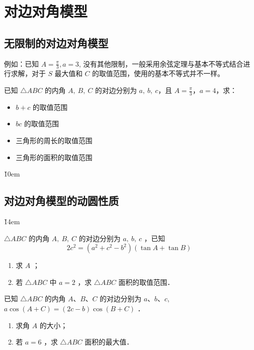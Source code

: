 \section{对边对角模型}

\subsection{无限制的对边对角模型}

\begin{theorem}[无限制的对边对角模型]
    例如：已知 $A = \frac{\pi}{3}, a=3$, 没有其他限制，一般采用余弦定理与基本不等式结合进行求解，对于 $S$ 最大值和 $C$ 的取值范围，使用的基本不等式并不一样。
\end{theorem}

\begin{example}
    已知 $\triangle A B C$ 的内角 $A, ~ B, ~ C$ 的对边分别为 $a, ~ b, ~ c$，且 $A = \frac{\pi}{3}$，$a = 4$，求：
    \begin{itemize}
        \item $b + c$ 的取值范围
        \item $b c$ 的取值范围
        \item 三角形的周长的取值范围
        \item 三角形的面积的取值范围
    \end{itemize}
\end{example}

\v{10em}

\subsection{对边对角模型的动圆性质}

\v{14em}

\begin{example}
    $\triangle A B C$ 的内角 $A, ~ B, ~ C$ 的对边分别为 $a, ~ b, ~ c$ ，已知
    $$
        2 c^2=\left(a^2+c^2-b^2\right)(\tan A+\tan B)
    $$
    \begin{enumerate}
        \item 求 $A$ ；
        \item 若 $\triangle A B C$ 中 $a=2$ ，求 $\triangle A B C$ 面积的取值范围．
    \end{enumerate}
\end{example}

\vspace{12em}

\begin{example}
    已知 $\triangle A B C$ 的内角 $A$、$B$、$C$ 的对边分别为 $a$、$b$、$c$, $a \cos (A+C)=(2 c-b) \cos (B+C)$ ．
    \begin{enumerate}
        \item 求角 $A$ 的大小；
        \item 若 $a=6$ ，求 $\triangle A B C$ 面积的最大值．
    \end{enumerate}
\end{example}


